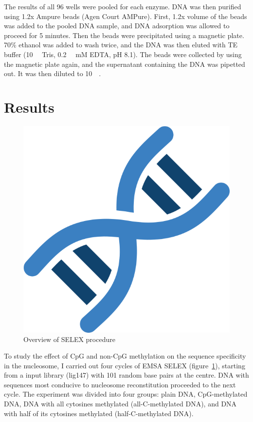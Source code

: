 \documentclass[parskip=full, numbers=noenddot]{scrreprt}
\begin{document}
The results of all 96 wells were pooled for each enzyme. DNA was then purified using 1.2x Ampure beads (Agen Court AMPure). First, 1.2x volume of the beads was added to the pooled DNA sample, and DNA adsorption was allowed to proceed for 5 minutes. Then the beads were precipitated using a magnetic plate. 70\% ethanol was added to wash twice, and the DNA was then eluted with TE buffer (\SI{10}{\milli\Molar} Tris, \SI{0.2}{\milli\Molar} mM EDTA, pH 8.1). The beads were collected by using the magnetic plate again, and the supernatant containing the DNA was pipetted out. It was then diluted to \SI{10}{\nano\Molar}.


\section{Results}
\label{sec:emsaselex_results}

\begin{figure}[htpb]
  \centering
  \includegraphics[width=\textwidth]{test}
  \caption{Overview of SELEX procedure}
  \label{fig:selex}
\end{figure}

To study the effect of CpG and non-CpG methylation on the sequence specificity in the nucleosome, I carried out four cycles of EMSA SELEX (figure~\ref{fig:selex}), starting from a input library (lig147) with 101 random base pairs at the centre. DNA with sequences most conducive to nucleosome reconstitution proceeded to the next cycle. The experiment was divided into four groups: plain DNA, CpG-methylated DNA, DNA with all cytosines methylated (all-C-methylated DNA), and DNA with half of its cytosines methylated (half-C-methylated DNA).
\end{document}
